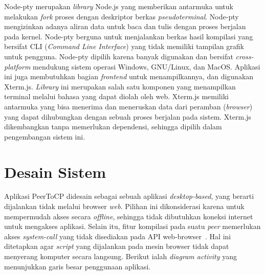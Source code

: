 Node-pty merupakan \textit{library} Node.js yang memberikan antarmuka untuk melakukan \textit{fork} proses dengan deskriptor berkas \textit{pseudoterminal}. Node-pty mengizinkan adanya aliran data untuk baca dan tulis dengan proses berjalan pada kernel. Node-pty berguna untuk menjalankan berkas hasil kompilasi yang bersifat CLI (\textit{Command Line Interface}) yang tidak memiliki tampilan grafik untuk pengguna. Node-pty dipilih karena banyak digunakan dan bersifat \textit{cross-platform} mendukung sistem operasi Windows, GNU/Linux, dan MacOS. Aplikasi ini juga membutuhkan bagian \textit{frontend} untuk menampilkannya, dan digunakan Xterm.js. \textit{Library} ini merupakan salah satu komponen yang menampilkan terminal melalui bahasa yang dapat diolah oleh web. Xterm.js memiliki antarmuka yang bisa menerima dan meneruskan data dari peramban (\textit{browser}) yang dapat dihubungkan dengan sebuah proses berjalan pada sistem. Xterm.js dikembangkan tanpa memerlukan dependensi, sehingga dipilih dalam pengembangan sistem ini.

\section{Desain Sistem}

Aplikasi PeerToCP didesain sebagai sebuah aplikasi \textit{desktop-based}, yang berarti dijalankan tidak melalui browser \textit{web}. Pilihan ini dikonsiderasi karena untuk mempermudah akses secara \textit{offline}, sehingga tidak dibutuhkan koneksi internet untuk mengakses aplikasi. Selain itu, fitur kompilasi pada suatu \textit{peer} memerlukan akses \textit{system-call} yang tidak disediakan pada API web-browser~\citep{v8, spidermonkey}. Hal ini ditetapkan agar \textit{script} yang dijalankan pada mesin browser tidak dapat menyerang komputer secara langsung. Berikut ialah \textit{diagram activity} yang menunjukkan garis besar penggunaan aplikasi.

